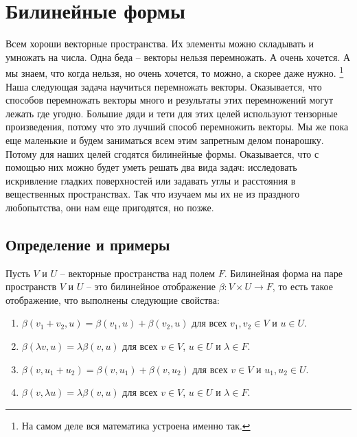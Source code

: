 \newpage
\section{Билинейные формы}

Всем хороши векторные пространства.
Их элементы можно складывать и умножать на числа.
Одна беда -- векторы нельзя перемножать.
А очень хочется.
А мы знаем, что когда нельзя, но очень хочется, то можно, а скорее даже нужно.%
\footnote{На самом деле вся математика устроена именно так.}
Наша следующая задача научиться перемножать векторы.
Оказывается, что способов перемножать векторы много и результаты этих перемножений могут лежать где угодно.
Большие дяди и тети для этих целей используют тензорные произведения, потому что это лучший способ перемножить векторы.
Мы же пока еще маленькие и будем заниматься всем этим запретным делом понарошку.
Потому для наших целей сгодятся билинейные формы.
Оказывается, что с помощью них можно будет уметь решать два вида задач: исследовать искривление гладких поверхностей или задавать углы и расстояния в вещественных пространствах.
Так что изучаем мы их не из праздного любопытства, они нам еще пригодятся, но позже.

\subsection{Определение и примеры}

\begin{definition}
\label{def::BilinearForms}
Пусть $V$ и $U$ -- векторные пространства над полем $F$.
Билинейная форма на паре пространств $V$ и $U$ -- это билинейное отображение $\beta\colon V\times U \to F$, то есть такое отображение, что выполнены следующие свойства:
\begin{enumerate}
\item $\beta(v_1 + v_2, u) = \beta(v_1,u) + \beta(v_2,u)$ для всех $v_1,v_2\in V$ и $u\in U$.

\item $\beta(\lambda v, u) = \lambda \beta(v,u)$ для всех $v\in V$, $u\in U$ и $\lambda\in F$.

\item $\beta(v, u_1+u_2) = \beta(v, u_1) + \beta(v,u_2)$ для всех $v\in V$ и $u_1,u_2\in U$.

\item $\beta(v,\lambda u) = \lambda\beta(v,u)$ для всех $v\in V$, $u\in U$ и $\lambda\in F$.
\end{enumerate}
\end{definition}

